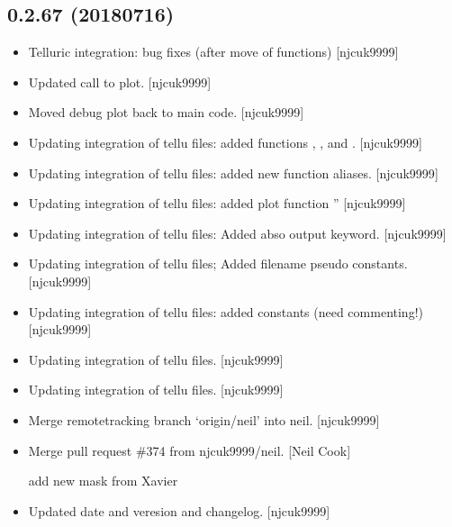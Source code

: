 \documentclass[a4paper,10pt,english]{report}
\begin{document}
\subsection{0.2.67 (2018\sphinxhyphen{}07\sphinxhyphen{}16)}
\label{\detokenize{misc/changelog:id410}}\begin{itemize}
\item {} 
Telluric integration: bug fixes (after move of functions) {[}njcuk9999{]}

\item {} 
Updated call to plot. {[}njcuk9999{]}

\item {} 
Moved debug plot back to main code. {[}njcuk9999{]}

\item {} 
Updating integration of tellu files: added functions \sphinxhyphen{}
, ,
 and . {[}njcuk9999{]}

\item {} 
Updating integration of tellu files: added new function aliases.
{[}njcuk9999{]}

\item {} 
Updating integration of tellu files: added plot function
” {[}njcuk9999{]}

\item {} 
Updating integration of tellu files: Added abso output keyword.
{[}njcuk9999{]}

\item {} 
Updating integration of tellu files; Added filename pseudo constants.
{[}njcuk9999{]}

\item {} 
Updating integration of tellu files: added constants (need
commenting!) {[}njcuk9999{]}

\item {} 
Updating integration of tellu files. {[}njcuk9999{]}

\item {} 
Updating integration of tellu files. {[}njcuk9999{]}

\item {} 
Merge remote\sphinxhyphen{}tracking branch ‘origin/neil’ into neil. {[}njcuk9999{]}

\item {} 
Merge pull request \#374 from njcuk9999/neil. {[}Neil Cook{]}

add new mask from Xavier

\item {} 
Updated date and veresion and changelog. {[}njcuk9999{]}

\end{itemize}
\end{document}
